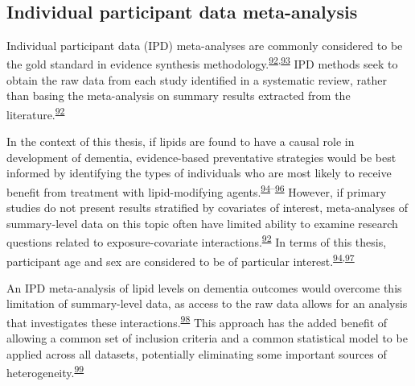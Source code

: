 \documentclass[a4paper, twoside]{templates/ociamthesis}
\begin{document}
~

\hypertarget{individual-participant-data-meta-analysis}{%
\subsection{Individual participant data meta-analysis}\label{individual-participant-data-meta-analysis}}

Individual participant data (IPD) meta-analyses are commonly considered to be the gold standard in evidence synthesis methodology.\textsuperscript{\protect\hyperlink{ref-riley2010}{92},\protect\hyperlink{ref-stewart1993}{93}} IPD methods seek to obtain the raw data from each study identified in a systematic review, rather than basing the meta-analysis on summary results extracted from the literature.\textsuperscript{\protect\hyperlink{ref-riley2010}{92}}

In the context of this thesis, if lipids are found to have a causal role in development of dementia, evidence-based preventative strategies would be best informed by identifying the types of individuals who are most likely to receive benefit from treatment with lipid-modifying agents.\textsuperscript{\protect\hyperlink{ref-arain2009}{94}--\protect\hyperlink{ref-mccartney2016}{96}} However, if primary studies do not present results stratified by covariates of interest, meta-analyses of summary-level data on this topic often have limited ability to examine research questions related to exposure-covariate interactions.\textsuperscript{\protect\hyperlink{ref-riley2010}{92}} In terms of this thesis, participant age and sex are considered to be of particular interest.\textsuperscript{\protect\hyperlink{ref-arain2009}{94},\protect\hyperlink{ref-letenneur1999}{97}}

An IPD meta-analysis of lipid levels on dementia outcomes would overcome this limitation of summary-level data, as access to the raw data allows for an analysis that investigates these interactions.\textsuperscript{\protect\hyperlink{ref-riley2020}{98}} This approach has the added benefit of allowing a common set of inclusion criteria and a common statistical model to be applied across all datasets, potentially eliminating some important sources of heterogeneity.\textsuperscript{\protect\hyperlink{ref-stewart2002}{99}}
\end{document}
